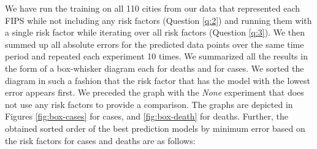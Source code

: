 \documentclass[12pt]{article}
\theoremstyle{definition}
\renewcommand{\_}{%
    \textunderscore\hspace{0pt}%
}
\begin{document}

We have run the training on all 110 cities from our data that represented each FIPS while not including any risk factors (Question \ref{q:2}) and running them with a single risk factor while iterating over all risk factors (Question \ref{q:3}). We then summed up all absolute errors for the predicted data points over the same time period and repeated each experiment 10 times. We summarized all the results in the form of a box-whisker diagram each for deaths and for cases. We sorted the diagram in such a fashion that the risk factor that has the model with the lowest error appears first. We preceded the graph with the {\em None} experiment that does not use any risk factors to provide a comparison. The graphs are depicted in Figures \ref{fig:box-cases} for cases, and \ref{fig:box-death} for deaths. 
Further, the obtained sorted order of the best prediction models by minimum error based on the risk factors for cases and deaths are as follows:
\end{document}
